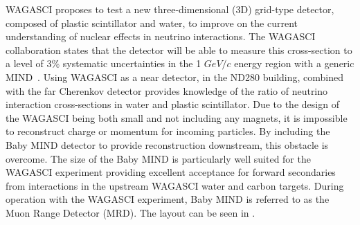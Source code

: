 WAGASCI proposes to test a new three-dimensional (3D) grid-type detector, composed of plastic scintillator and water, to improve on the current understanding of nuclear effects in neutrino interactions. The WAGASCI collaboration states that the detector will be able to measure this cross-section to a level of 3\% systematic uncertainties in the 1 $GeV/c$ energy region with a generic MIND~\cite{30WAGASCI}. %
Using WAGASCI as a near detector, in the ND280 building, combined with the far Cherenkov detector provides knowledge of the ratio of neutrino interaction cross-sections in water and plastic scintillator. Due to the design of the WAGASCI being both small and not including any magnets, it is impossible to reconstruct charge or momentum for incoming particles. By including the Baby MIND detector to provide reconstruction downstream, this obstacle is overcome. The size of the Baby MIND is particularly well suited for the WAGASCI experiment providing excellent acceptance for forward secondaries from interactions in the upstream WAGASCI water and carbon targets. During operation with the WAGASCI experiment, Baby MIND is referred to as the Muon Range Detector (MRD). The layout can be seen in .




